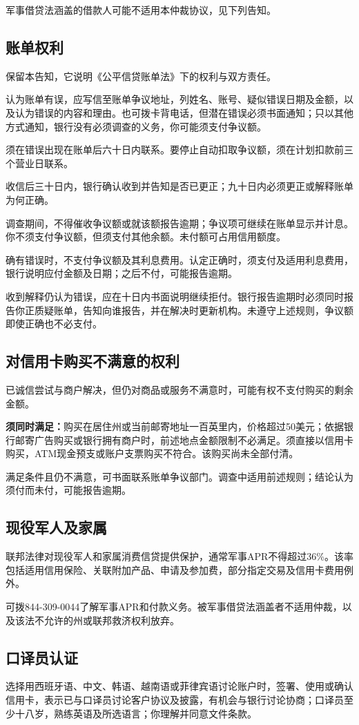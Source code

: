 \documentclass[UTF8,fontset=none,11pt,a4paper]{ctexart}
\begin{document}
军事借贷法涵盖的借款人可能不适用本仲裁协议，见下列告知。


\subsection*{账单权利}
保留本告知，它说明《公平信贷账单法》下的权利与双方责任。


认为账单有误，应写信至账单争议地址，列姓名、账号、疑似错误日期及金额，以及认为错误的内容和理由。也可拨卡背电话，但潜在错误必须书面通知；只以其他方式通知，银行没有必须调查的义务，你可能须支付争议额。


须在错误出现在账单后六十日内联系。要停止自动扣取争议额，须在计划扣款前三个营业日联系。


收信后三十日内，银行确认收到并告知是否已更正；九十日内必须更正或解释账单为何正确。


调查期间，不得催收争议额或就该额报告逾期；争议项可继续在账单显示并计息。你不须支付争议额，但须支付其他余额。未付额可占用信用额度。


确有错误时，不支付争议额及其利息费用。认定正确时，须支付及适用利息费用，银行说明应付金额及日期；之后不付，可能报告逾期。


收到解释仍认为错误，应在十日内书面说明继续拒付。银行报告逾期时必须同时报告你正质疑账单，告知向谁报告，并在解决时更新机构。未遵守上述规则，争议额即使正确也不必支付。


\subsection*{对信用卡购买不满意的权利}
已诚信尝试与商户解决，但仍对商品或服务不满意时，可能有权不支付购买的剩余金额。


\textbf{须同时满足：}购买在居住州或当前邮寄地址一百英里内，价格超过50美元；依据银行邮寄广告购买或银行拥有商户时，前述地点金额限制不必满足。须直接以信用卡购买，ATM现金预支或账户支票购买不符合。该购买尚未全部付清。


满足条件且仍不满意，可书面联系账单争议部门。调查中适用前述规则；结论认为须付而未付，可能报告逾期。


\subsection*{现役军人及家属}
联邦法律对现役军人和家属消费信贷提供保护，通常军事APR不得超过36\%。该率包括适用信用保险、关联附加产品、申请及参加费，部分指定交易及信用卡费用例外。


可拨844-309-0044了解军事APR和付款义务。被军事借贷法涵盖者不适用仲裁，以及该法不允许的州或联邦救济权利放弃。


\subsection*{口译员认证}
选择用西班牙语、中文、韩语、越南语或菲律宾语讨论账户时，签署、使用或确认信用卡，表示已与口译员讨论客户协议及披露，有机会与银行讨论协商；口译员至少十八岁，熟练英语及所选语言；你理解并同意文件条款。
\end{document}
